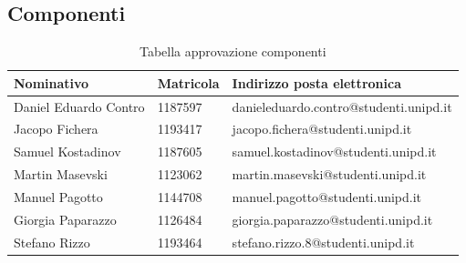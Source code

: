 \documentclass[../piano_di_progetto.tex]{subfiles}
\begin{document}
\newpage
\subsection{Componenti}%
\label{sub:comp}

\begin{table}[!ht]
	\centering
	\begin{tabular}{|l|l|l|}
		\hline
		\rowcolor{lightgray}
		\textbf{Nominativo} & \textbf{Matricola} & \textbf{Indirizzo posta elettronica} \\ 
		\hline
		Daniel Eduardo Contro & 1187597 & danieleduardo.contro@studenti.unipd.it \\ 
		Jacopo Fichera & 1193417  & jacopo.fichera@studenti.unipd.it \\ 
		Samuel Kostadinov & 1187605 & samuel.kostadinov@studenti.unipd.it \\ 
		Martin Masevski & 1123062 & martin.masevski@studenti.unipd.it \\ 
		Manuel Pagotto & 1144708 & manuel.pagotto@studenti.unipd.it \\ 
		Giorgia Paparazzo & 1126484 & giorgia.paparazzo@studenti.unipd.it \\ 
		Stefano Rizzo & 1193464 & stefano.rizzo.8@studenti.unipd.it \\ 
		\hline
	\end{tabular}
		\caption{Tabella approvazione componenti}
\end{table}
\end{document}
